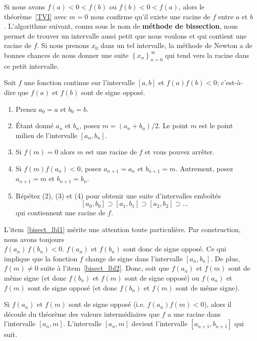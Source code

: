 {Si nous avons $f(a) < 0 < f(b)$ ou $f(b) < 0 < f(a)$, alors le
théorème~\ref{TVI} avec $m=0$ nous confirme qu'il existe une racine de
$f$ entre $a$ et $b$.  L'algorithme suivant, connu sous le nom de
{\bfseries méthode de bissection}, nous permet de trouver un
intervalle aussi petit que nous voulons et qui contient une racine de
$f$.  Si nous prenons $x_0$ dans un tel intervalle, la méthode de Newton a
de bonnes chances de nous donner une suite
$\displaystyle \left\{x_n\right\}_{n=0}^\infty$ qui tend vers la
racine dans ce petit intervalle.

\begin{meth} 
Soit $f$ une fonction continue sur l'intervalle $[a,b]$ et
$f(a) f(b) < 0$;  c'est-à-dire que $f(a)$ et $f(b)$ sont de signe
opposé.
\begin{enumerate}
\item Prenez $a_0=a$ et $b_0=b$.
\item Étant donné $a_n$ et $b_n$, posez $m = (a_n+b_n)/2$.  Le point
$m$ est le point milieu de l'intervalle $[a_n,b_n]$.
\item Si $f(m)=0$ alors $m$ est une racine de $f$ et vous pouvez arrêter.
\label{bisect_lbl2}
\item Si $f(m)f(a_n) < 0$, posez $a_{n+1}=a_n$ et $b_{n+1}=m$.
Autrement, posez $a_{n+1}=m$ et $b_{n+1}=b_n$.\label{bisect_lbl1}
\item Répétez (2), (3) et (4) pour obtenir une suite d'intervalles
emboîtés
\[
[a_0,b_0] \supset [a_1, b_1] \supset [a_2, b_2] \supset \ldots
\]
qui contiennent une racine de $f$.
\end{enumerate}
\end{meth}

L'item~\ref{bisect_lbl1} mérite une attention toute particulière.  Par
construction, nous avons toujours\\
$f(a_n)\,f(b_n)<0$.  $f(a_n)$ et
$f(b_n)$ sont donc de signe opposé.  Ce qui implique que la fonction $f$
change de signe dans l'intervalle $[a_n,b_n]$.  De plus, $f(m) \neq 0$
suite à l'item~\ref{bisect_lbl2}.  Donc, soit que $f(a_n)$ et $f(m)$
sont de même signe (et donc $f(b_n)$ et $f(m)$ sont de signe opposé)
ou $f(a_n)$ et $f(m)$ sont de signe opposé (et donc $f(b_n)$ et $f(m)$
sont de même signe).

Si $f(a_n)$ et $f(m)$ sont de signe opposé (i.e. $f(a_n)f(m)<0$), alors
il découle du théorème des valeurs intermédiaires que $f$ a une racine dans
l'intervalle $[a_n,m]$.  L'intervalle $[a_n,m]$ devient l'intervalle
$[a_{n+1},b_{n+1}]$ qui suit.

}
